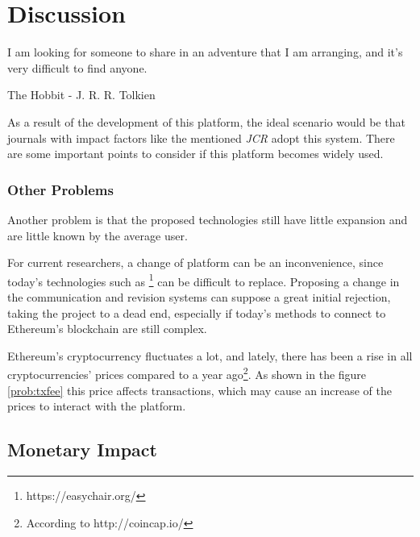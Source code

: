 \chapter{Discussion}

\begin{FraseCelebre}
    \begin{Frase}
        I am looking for someone to share in an adventure that I am arranging, and
        it's very difficult to find anyone.
    \end{Frase}
    \begin{Fuente}
        The Hobbit - J. R. R. Tolkien
    \end{Fuente}
\end{FraseCelebre}

As a result of the development of this platform, the ideal scenario would be that journals with impact factors like the mentioned \emph{JCR} adopt this system.
There are some important points to consider if this platform becomes widely used.


\subsection{Other Problems}

Another problem is that the proposed technologies still have little expansion and are little known by the average user.

For current researchers, a change of platform can be an inconvenience, since today's technologies such as \footnote{https://easychair.org/} can be difficult to replace. Proposing a change in the communication and revision systems can suppose a great initial rejection, taking the project to a dead end, especially if today's methods to connect to Ethereum's blockchain are still complex.

Ethereum's cryptocurrency fluctuates a lot, and lately, there has been a rise in all cryptocurrencies' prices compared to a year ago\footnote{According to http://coincap.io/}. As shown in the figure \ref{prob:txfee} this price affects transactions, which may cause an increase of the prices to interact with the platform.


\section{Monetary Impact}


